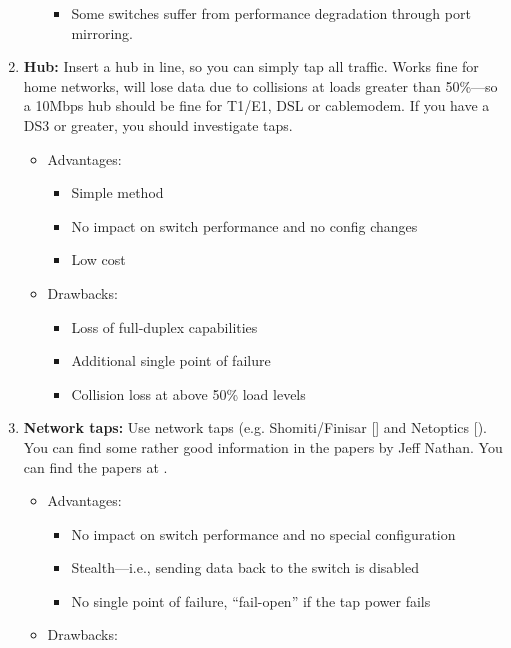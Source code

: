 \documentclass{article}
\begin{document}
\begin{enumerate}
\begin{itemize}
\begin{itemize}
	      \item Some switches suffer from performance degradation through port
	      mirroring.
	      \end{itemize}
    \end{itemize}
\item  {\bf Hub:} Insert a hub in line, so you can simply tap all traffic. Works
    fine for home networks, will lose data due to collisions at loads greater
    than 50\%---so a 10Mbps hub should be fine for T1/E1, DSL or cablemodem. If
    you have a DS3 or greater, you should investigate taps.
    \begin{itemize}
      \item Advantages:
      		\begin{itemize}
		\item Simple method
		\item No impact on switch performance and no config changes
		\item Low cost
		\end{itemize}
      \item Drawbacks:
      		\begin{itemize}
		\item Loss of full-duplex capabilities
		\item Additional single point of failure
		\item Collision loss at above 50\% load levels
		\end{itemize}
    \end{itemize}
\item  {\bf Network taps:} Use network taps (e.g. Shomiti/Finisar [] and Netoptics [). You can find some rather good information in the papers by Jeff  Nathan. You can find the papers at 
    .
      \begin{itemize}
      \item Advantages:
      		\begin{itemize}
		\item No impact on switch performance and no special configuration
		\item Stealth---i.e., sending data back to the switch is disabled
		\item No single point of failure, ``fail-open'' if the tap power fails
		\end{itemize}
      \item Drawbacks:

\end{itemize}
\end{enumerate}
\end{document}
